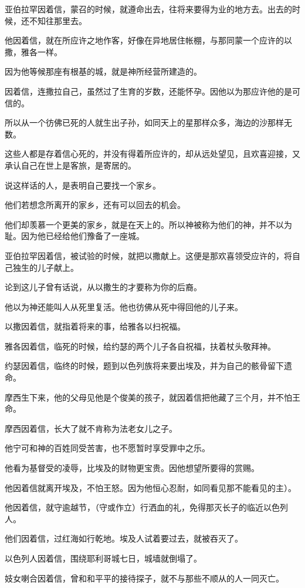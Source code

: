 \documentclass[12pt,oneside]{book}
\begin{document}
亚伯拉罕因着信，蒙召的时候，就遵命出去，往将来要得为业的地方去。出去的时候，还不知往那里去。

他因着信，就在所应许之地作客，好像在异地居住帐棚，与那同蒙一个应许的以撒，雅各一样。

因为他等候那座有根基的城，就是神所经营所建造的。

因着信，连撒拉自己，虽然过了生育的岁数，还能怀孕。因他以为那应许他的是可信的。

所以从一个彷佛已死的人就生出子孙，如同天上的星那样众多，海边的沙那样无数。

这些人都是存着信心死的，并没有得着所应许的，却从远处望见，且欢喜迎接，又承认自己在世上是客旅，是寄居的。

说这样话的人，是表明自己要找一个家乡。

他们若想念所离开的家乡，还有可以回去的机会。

他们却羡慕一个更美的家乡，就是在天上的。所以神被称为他们的神，并不以为耻。因为他已经给他们豫备了一座城。

亚伯拉罕因着信，被试验的时候，就把以撒献上。这便是那欢喜领受应许的，将自己独生的儿子献上。

论到这儿子曾有话说，从以撒生的才要称为你的后裔。

他以为神还能叫人从死里复活。他也彷佛从死中得回他的儿子来。

以撒因着信，就指着将来的事，给雅各以扫祝福。

雅各因着信，临死的时候，给约瑟的两个儿子各自祝福，扶着杖头敬拜神。

约瑟因着信，临终的时候，题到以色列族将来要出埃及，并为自己的骸骨留下遗命。

摩西生下来，他的父母见他是个俊美的孩子，就因着信把他藏了三个月，并不怕王命。

摩西因着信，长大了就不肯称为法老女儿之子。

他宁可和神的百姓同受苦害，也不愿暂时享受罪中之乐。

他看为基督受的凌辱，比埃及的财物更宝贵。因他想望所要得的赏赐。

他因着信就离开埃及，不怕王怒。因为他恒心忍耐，如同看见那不能看见的主）。

他因着信，就守逾越节，（守或作立）行洒血的礼，免得那灭长子的临近以色列人。

他们因着信，过红海如行乾地。埃及人试着要过去，就被吞灭了。

以色列人因着信，围绕耶利哥城七日，城墙就倒塌了。

妓女喇合因着信，曾和和平平的接待探子，就不与那些不顺从的人一同灭亡。
\end{document}
